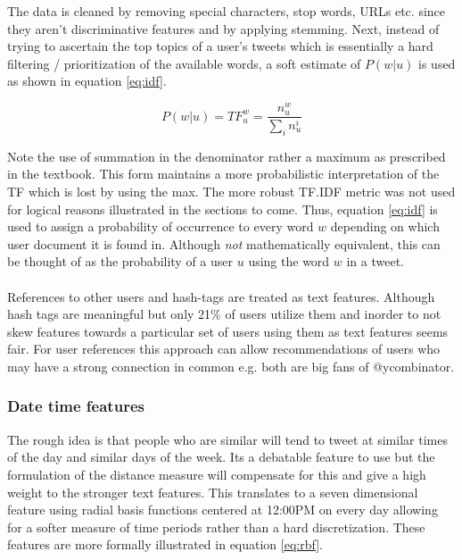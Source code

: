 \documentclass{article}
\begin{document}
The data is cleaned by removing special characters, stop words, URLs etc. since they aren't 
discriminative features and by applying stemming. Next, instead of trying to
ascertain the top topics of a user's tweets which is essentially a hard filtering / prioritization
of the available words, a soft estimate of $P(w|u)$ is used as shown in equation \ref{eq:idf}.

\begin{center}
\begin{equation}
P(w|u) = TF_{u}^w = \frac{n_{u}^w}{\sum_{i}^{}n_{u}^i}
\label{eq:idf}
\end{equation}
\end{center}

Note the use of summation in the denominator rather a maximum as prescribed in the textbook.
This form maintains a more probabilistic interpretation of the TF which is lost by using the
max. The more robust TF.IDF metric was not used for logical reasons illustrated in the
sections to come. Thus, equation \ref{eq:idf} is used to assign a probability of occurrence to every
word $w$ depending on which user document it is found in. Although \textit{not}
mathematically equivalent, this can be thought of as the probability of a user $u$ using the word $w$ in
a tweet.\\\\

References to other users and hash-tags are treated as text features. Although hash tags
are meaningful but only 21\% of users utilize them and inorder to not skew features towards
a particular set of users using them as text features seems fair. For user
references this approach can allow recommendations of users who may have a strong connection in
common e.g. both are big fans of @ycombinator.

\subsubsection{Date time features}

The rough idea is that people who are similar will tend to tweet at similar times
of the day and similar days of the week. Its a debatable feature to use but the formulation
of the distance measure will compensate for this and give a high weight to the stronger
text features. This translates to a seven dimensional feature using radial basis functions
centered at 12:00PM on every day allowing for a softer measure of time periods rather
than a hard discretization. These features are more formally illustrated in equation
\ref{eq:rbf}.
\end{document}
